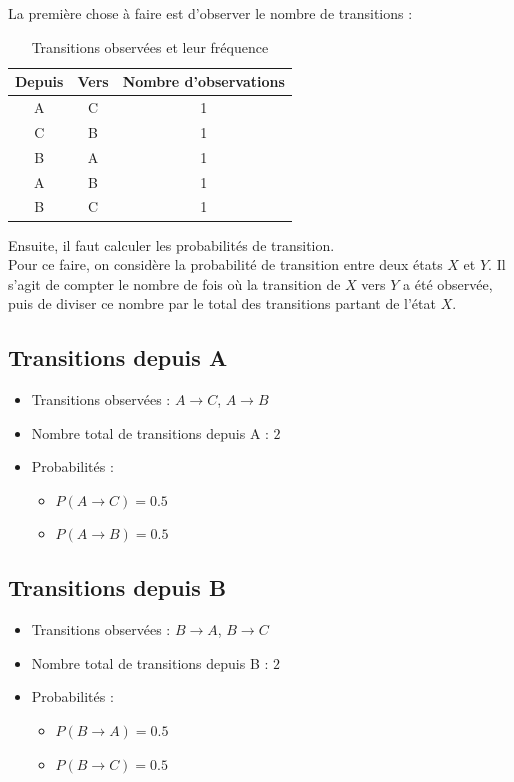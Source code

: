 \documentclass[a4paper, 11pt]{report}
\begin{document}
\noindent{}La première chose à faire est d'observer le nombre de transitions :
\begin{table}[h!]
	\centering
	\begin{tabular}{|c|c|c|}
		\hline
		\textbf{Depuis} & \textbf{Vers} & \textbf{Nombre d'observations} \\
		\hline
		A               & C             & 1                              \\
		C               & B             & 1                              \\
		B               & A             & 1                              \\
		A               & B             & 1                              \\
		B               & C             & 1                              \\
		\hline
	\end{tabular}
	\caption{Transitions observées et leur fréquence}
\end{table}

Ensuite, il faut calculer les probabilités de transition. \\
Pour ce faire, on considère la probabilité de transition entre deux états \(X\) et \(Y\). Il s'agit de compter le nombre de fois où la transition de \(X\) vers \(Y\) a été observée, puis de diviser ce nombre par le total des transitions partant de l'état \(X\).

\subsection*{Transitions depuis A}
\begin{itemize}
	\item Transitions observées : \( A \rightarrow C \), \( A \rightarrow B \)
	\item Nombre total de transitions depuis A : \(2\)
	\item Probabilités :
	      \begin{itemize}
		      \item \( P(A \rightarrow C)  = 0.5 \)
		      \item \( P(A \rightarrow B)  = 0.5 \)
	      \end{itemize}
\end{itemize}

\subsection*{Transitions depuis B}
\begin{itemize}
	\item Transitions observées : \( B \rightarrow A \), \( B \rightarrow C \)
	\item Nombre total de transitions depuis B : \(2\)
	\item Probabilités :
	      \begin{itemize}
		      \item \( P(B \rightarrow A) = 0.5 \)
		      \item \( P(B \rightarrow C) = 0.5 \)
	      \end{itemize}
\end{itemize}
\end{document}
